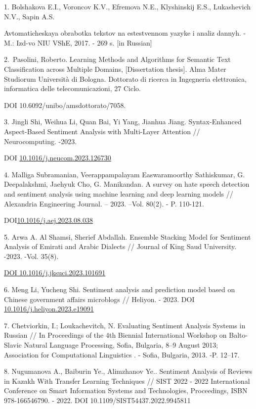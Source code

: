 \begin{references}
1. Bolshakova E.I., Voroncov K.V., Efremova N.E., Klyshinskij E.S.,
Lukashevich N.V., Sapin A.S. 

Avtomaticheskaya obrabotka tekstov na
estestvennom yazyke i analiz dannyh. - M.: Izd-vo NIU VShE, 2017. - 269
s. {[}in Russian{]}

2.~Pasolini, Roberto. Learning Methods and Algorithms for Semantic Text
Classification across Multiple Domains, {[}Dissertation thesis{]}. Alma
Mater Studiorum Università di Bologna. Dottorato di ricerca in
Ingegneria elettronica, informatica delle telecomunicazioni, 27 Ciclo.

DOI 10.6092/unibo/amsdottorato/7058.

3. Jingli Shi, Weihua Li, Quan Bai, Yi Yang, Jianhua Jiang.
Syntax-Enhanced Aspect-Based Sentiment Analysis with Multi-Layer
Attention // Neurocomputing. -2023.

DOI
\href{https://doi.org/10.1016/j.neucom.2023.126730}{10.1016/j.neucom.2023.126730}

4. Malliga Subramanian, Veerappampalayam Easwaramoorthy Sathiskumar, G.
Deepalakshmi, Jaehyuk Cho, G. Manikandan. A survey on hate speech
detection and sentiment analysis using machine learning and deep
learning models // Alexandria Engineering Journal. -- 2023. --Vol.
80(2). - P. 110-121.

DOI\href{http://dx.doi.org/10.1016/j.aej.2023.08.038}{10.1016/j.aej.2023.08.038}

5. Arwa A. Al Shamsi, Sherief Abdallah. Ensemble Stacking Model for
Sentiment Analysis of Emirati and Arabic Dialects // Journal of King
Saud University. -2023. -Vol. 35(8).

\href{https://doi.org/10.1016/j.jksuci.2023.101691}{DOI
10.1016/j.jksuci.2023.101691}

6. Meng Li, Yucheng Shi. Sentiment analysis and prediction model based
on Chinese government affairs microblogs // Heliyon. - 2023. DOI
\href{https://doi.org/10.1016/j.heliyon.2023.e19091}{10.1016/j.heliyon.2023.e19091}

7. Chetviorkin, I.; Loukachevitch, N. Evaluating Sentiment Analysis
Systems in Russian // In Proceedings of the 4th Biennial International
Workshop on Balto-Slavic Natural Language Processing, Sofia, Bulgaria,
8--9 August 2013; Association for Computational Linguistics . - Sofia,
Bulgaria, 2013. -P. 12--17.

8. Nugumanova A., Baiburin Ye., Alimzhanov Ye.. Sentiment Analysis of
Reviews in Kazakh With Transfer Learning Techniques // SIST 2022 - 2022
International Conference on Smart Information Systems and Technologies,
Proceedings, ISBN 978-166546790. - 2022.
DOI 10.1109/SIST54437.2022.9945811


\end{references}
